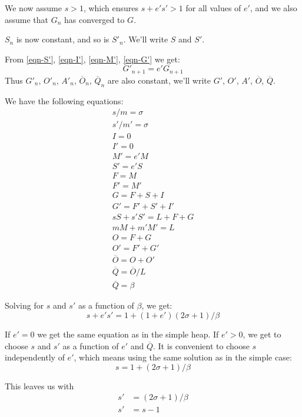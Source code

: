 \documentclass{article}
\begin{document}
We now assume $s > 1$, which ensures $s + e's' > 1$ for all values of
$e'$, and we also assume that $G_n$ has converged to $G$.

$S_n$ is now constant, and so is $S'_n$. We'll write $S$ and $S'$.

From \eqref{eqn-S'}, \eqref{eqn-I'}, \eqref{eqn-M'}, \eqref{eqn-G'} we get:
\begin{equation}
G'_{n+1} = e' G_{n+1}
\end{equation}
Thus $G'_n$, $O'_n$, $A'_n$, $\overline{O}_n$, $\overline{Q}_n$ are
also constant, we'll write $G'$, $O'$, $A'$, $\overline{O}$,
$\overline{Q}$.

We have the following equations:
\begin{gather*}
 s/m = \sigma \\
 s' / m' = \sigma \\
 I = 0 \\
 I' = 0 \\
 M' = e' M \\
 S' = e' S \\
 F = M \\
 F' = M' \\
 G = F + S + I \\
 G' = F' + S' + I' \\
 sS + s'S' = L + F + G \\
 mM + m'M' = L \\
 O = F + G \\
 O' = F' + G' \\
 \overline{O} = O + O' \\
 \overline{Q} = \overline{O} / L \\
 \overline{Q} = \beta
\end{gather*}

Solving for $s$ and $s'$ as a function of $\beta$, we get:
\begin{equation}
s + e' s' = 1 + (1+e') (2\sigma+1)/\beta
\end{equation}

If $e' = 0$ we get the same equation as in the simple heap. If $e' >
0$, we get to choose $s$ and $s'$ as a function of $e'$ and
$\overline{Q}$. It is convenient to choose $s$ independently of $e'$,
which means using the same solution as in the simple case:
\begin{equation} \label{solution-s'}
s = 1 + (2\sigma+1)/\beta
\end{equation}

This leaves us with
\begin{align}
s' & = (2\sigma+1)/\beta \\
s' & = s - 1
\end{align}
\end{document}
